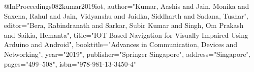 @InProceedings{082kumar2019iot,
author="Kumar, Aashis
and Jain, Monika
and Saxena, Rahul
and Jain, Vidyanshu
and Jaidka, Siddharth
and Sadana, Tushar",
editor="Bera, Rabindranath
and Sarkar, Subir Kumar
and Singh, Om Prakash
and Saikia, Hemanta",
title="IOT-Based Navigation for Visually Impaired Using Arduino and Android",
booktitle="Advances in Communication, Devices and Networking",
year="2019",
publisher="Springer Singapore",
address="Singapore",
pages="499--508",
isbn="978-981-13-3450-4"
}